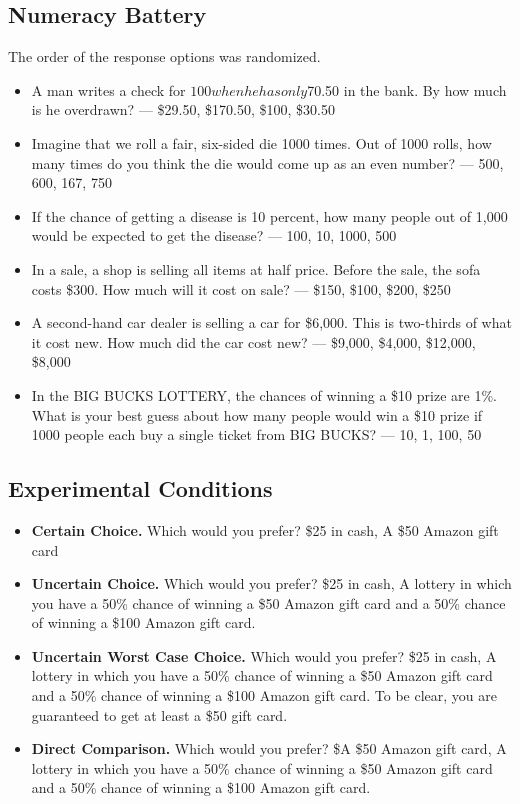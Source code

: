 \documentclass[12pt, letterpaper]{article}
\begin{document}
\subsection{Numeracy Battery}

The order of the response options was randomized.

\begin{itemize}
    \item A man writes a check for $100 when he has only $70.50 in the bank. By how much is he overdrawn? — \$29.50, \$170.50, \$100, \$30.50
    \item Imagine that we roll a fair, six-sided die 1000 times. Out of 1000 rolls, how many times do you think the die would come up as an even number? — 500, 600, 167, 750
    \item If the chance of getting a disease is 10 percent, how many people out of 1,000 would be expected to get the disease? — 100, 10, 1000, 500
    \item In a sale, a shop is selling all items at half price. Before the sale, the sofa costs \$300. How much will it cost on sale? — \$150, \$100, \$200, \$250
    \item A second-hand car dealer is selling a car for \$6,000. This is two-thirds of what it cost new. How much did the car cost new? — \$9,000, \$4,000, \$12,000, \$8,000
    \item In the BIG BUCKS LOTTERY, the chances of winning a \$10 prize are 1\%. What is your best guess about how many people would win a \$10 prize if 1000 people each buy a single ticket from BIG BUCKS? — 10, 1, 100, 50
\end{itemize}

\subsection{Experimental Conditions}

\begin{itemize}
    \item \textbf{Certain Choice.} Which would you prefer? \$25 in cash, A \$50 Amazon gift card
    
    \item \textbf{Uncertain Choice.} Which would you prefer? \$25 in cash, A lottery in which you have a 50\% chance of winning a \$50 Amazon gift card and a 50\% chance of winning a \$100 Amazon gift card.
    
    \item \textbf{Uncertain Worst Case Choice.} Which would you prefer? \$25 in cash, A lottery in which you have a 50\% chance of winning a \$50 Amazon gift card and a 50\% chance of winning a \$100 Amazon gift card. To be clear, you are guaranteed to get at least a \$50 gift card.

    \item \textbf{Direct Comparison.} Which would you prefer? \$A \$50 Amazon gift card, A lottery in which you have a 50\% chance of winning a \$50 Amazon gift card and a 50\% chance of winning a \$100 Amazon gift card.
    
\end{itemize}
\end{document}
